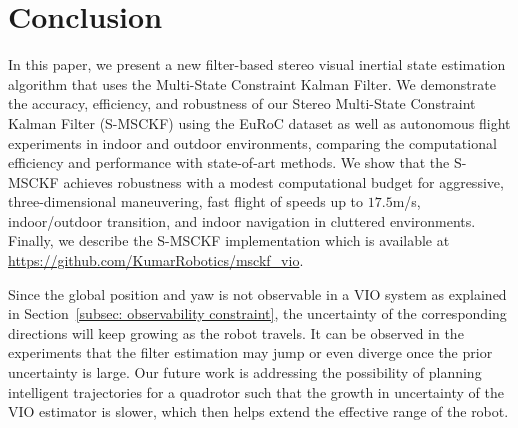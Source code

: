 \section{Conclusion}
\label{sec: conclusion}
In this paper, we present a new filter-based stereo visual inertial state estimation algorithm that uses the Multi-State Constraint Kalman Filter. We demonstrate the accuracy, efficiency, and robustness of our Stereo Multi-State Constraint Kalman Filter (S-MSCKF) using the EuRoC dataset as well as autonomous flight experiments in indoor and outdoor environments, comparing the computational efficiency and performance with state-of-art methods. We show that the S-MSCKF achieves robustness with a modest computational budget for aggressive, three-dimensional maneuvering, fast flight of speeds up to  $17.5$m/s, indoor/outdoor transition, and indoor navigation in cluttered environments. Finally, we describe the S-MSCKF implementation which is available at \url{https://github.com/KumarRobotics/msckf_vio}.

Since the global position and yaw is not observable in a VIO system as explained in Section~\ref{subsec: observability constraint}, the uncertainty of the corresponding directions will keep growing as the robot travels. It can be observed in the experiments that the filter estimation may jump or even diverge once the prior uncertainty is large. Our future work is addressing the possibility of planning intelligent trajectories for a quadrotor such that the growth in uncertainty of the VIO estimator is slower, which then helps extend the effective range of the robot.
